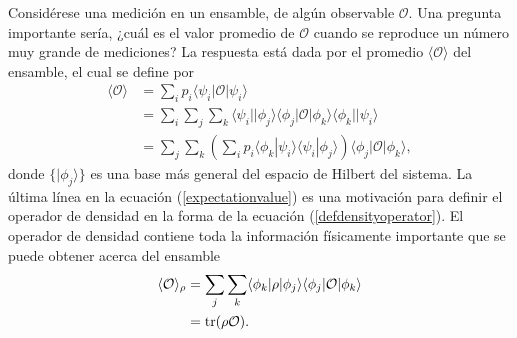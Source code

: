 Considérese una medición en un ensamble, de algún observable $\mathcal{O}$. Una
pregunta importante sería, ¿cuál es el valor promedio de $\mathcal{O}$ cuando
se reproduce un número muy grande de mediciones? La respuesta está dada por el
promedio $\langle \mathcal{O} \rangle$ del ensamble, el cual se define por
{\cite{sakurai2017modern}} \begin{equation}
 	\label{expectationvalue}
 	 \begin{split}
 		\langle \mathcal{O} \rangle &= \sum_{i}p_i \langle\psi_i|\mathcal{O}|\psi_i\rangle\\
 		&=\sum_i\sum_{j}\sum_k \langle\psi_i||\phi_j\rangle \langle \phi_j|\mathcal{O}|\phi_k\rangle \langle \phi_k||\psi_i\rangle\\
 		&=\sum_{j}\sum_k \left(\sum_{i} p_i \langle \phi_k|\psi_i\rangle  \langle\psi_i|\phi_j\rangle\right) \langle \phi_j|\mathcal{O}|\phi_k\rangle, 
 	\end{split}
\end{equation} 
donde $\{|\phi_j\rangle \}$ es una base más general 
del espacio de Hilbert del
sistema. La última línea en la ecuación ({\ref{expectationvalue}}) es una
motivación para  definir el operador de densidad  en la forma de la ecuación
({\ref{defdensityoperator}}). El operador de densidad contiene toda la
información físicamente importante que se puede obtener acerca del ensamble
{\cite{sakurai2017modern}}\begin{equation}
 	\label{expectationvalue_traza}
 	\begin{split}
 		\langle \mathcal{O} \rangle_{\rho} &=\sum_{j}\sum_k \langle \phi_k|\rho|\phi_j\rangle \langle \phi_j|\mathcal{O}|\phi_k\rangle\\
 		&= \rm{tr}(\rho \mathcal{O}).
 	\end{split}
\end{equation}

